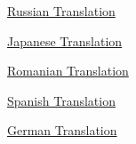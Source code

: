               
            
          

            
              
            
            
              
                
              
              
              
                \href{http://www.livejournal.com/users/thesz/5621.html}{Russian Translation}


              
              
              
                
              
              
              
                \href{http://d.hatena.ne.jp/doyu/20050523}{Japanese Translation}


              
            
            
              
            
            
              
            
            
              
                
              
              
              
                \href{http://ro.goobix.com/pg/writing44/}{Romanian Translation}


              
              
              
                
              
              
              
                \href{https://matiasandina.netlify.com/2020/01/escribiendo-en-pocas-palabras/}{Spanish Translation}


              
            
            
              
            
            
              
            
            
              
                
              
              
              
                \href{http://wiki.njh.eu/Schreiben\_-\_kurz\_gefasst}{German Translation}


